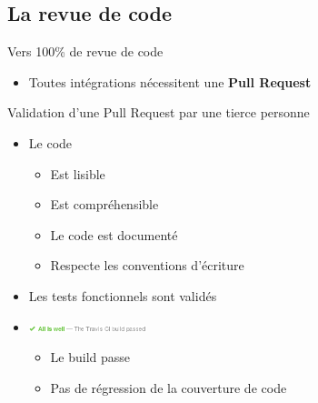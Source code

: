 		\subsection{La revue de code}
		\begin{frame}{Vers 100\% de revue de code}
			\begin{itemize}
				\item Toutes intégrations nécessitent une \textbf{Pull Request}
			\end{itemize}
			\vfill
			\pause
			\begin{block}{\normalsize Validation d'une Pull Request par une tierce personne}
				\begin{itemize}
					\item Le code
						\begin{itemize}
							\item Est lisible
							\item Est compréhensible
							\item Le code est documenté
							\item Respecte les conventions d'écriture
						\end{itemize}
					\item Les tests fonctionnels sont validés
					\item \includegraphics[height=7px]{images/all_is_well.png}
						\begin{itemize}
							\item Le build passe
							\item Pas de régression de la couverture de code
						\end{itemize}
				\end{itemize}
			\end{block}	
		\end{frame}
